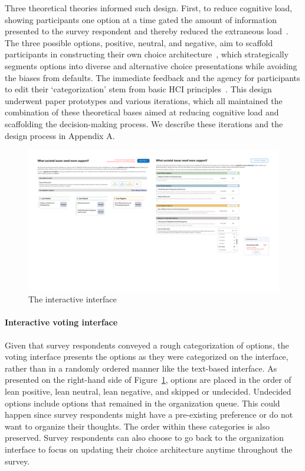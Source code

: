 Three theoretical theories informed such design. First, to reduce cognitive load, showing participants one option at a time gated the amount of information presented to the survey respondent and thereby reduced the extraneous load~\cite{swellerCognitiveLoadTheory2011}. The three possible options, positive, neutral, and negative, aim to scaffold participants in constructing their own choice architecture~\cite{munscherReviewTaxonomyChoice2016, thalerNudgeImprovingDecisions2008a}, which strategically segments options into diverse and alternative choice presentations while avoiding the biases from defaults. The immediate feedback and the agency for participants to edit their `categorization' stem from basic HCI principles~\cite{norman2013design}. This design underwent paper prototypes and various iterations, which all maintained the combination of these theoretical bases aimed at reducing cognitive load and scaffolding the decision-making process. We describe these iterations and the design process in Appendix A.

\begin{figure}[h]
    \centering
    \includegraphics[width=1\textwidth]{content/image/interface.png}
    \caption{The interactive interface}
    \label{fig:interactiveInterface}
\end{figure}

\paragraph{Interactive voting interface}
Given that survey respondents conveyed a rough categorization of options, the voting interface presents the options as they were categorized on the interface, rather than in a randomly ordered manner like the text-based interface. As presented on the right-hand side of Figure~\ref{fig:interactiveInterface}, options are placed in the order of lean positive, lean neutral, lean negative, and skipped or undecided. Undecided options include options that remained in the organization queue. This could happen since survey respondents might have a pre-existing preference or do not want to organize their thoughts. The order within these categories is also preserved. Survey respondents can also choose to go back to the organization interface to focus on updating their choice architecture anytime throughout the survey.

